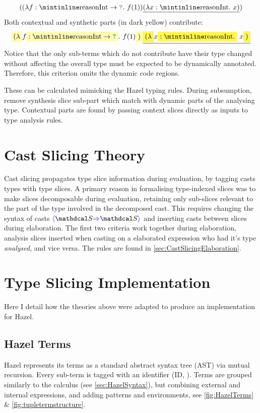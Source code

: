 \[((\lambda f: \code{Int} \to \dyn.\ f(1))\underline{(\lambda x : \code{Int}.\ x)})\]
Both contextual and synthetic parts (in dark yellow) contribute:
\[\hlcmaths[yellow!30]{(\lambda} f\hlcmaths[yellow!30]{: \code{Int} \to \dyn}.\ f(1)\hlcmaths[yellow!30]{)}\underline{\hlcmaths[yellow!70]{(\lambda} x \hlcmaths[yellow!70]{: \code{Int}.}\ x\hlcmaths[yellow!70]{)}}\]
Notice that the only sub-terms which do not contribute have their type changed without affecting the overall type must be expected to be dynamically annotated. Therefore, this criterion omits the dynamic code regions.

These can be calculated mimicking the Hazel typing rules. During subsumption, remove synthesis slice sub-part which match with dynamic parts of the analysing type. Contextual parts are found by passing context slices directly as inputs to type analysis rules.

\section{Cast Slicing Theory}\label{sec:CastSlicingTheory}
Cast slicing propagates type slice information during evaluation, by tagging casts types with type slices. A primary reason in formalising type-indexed slices was to make slices decomposable during evaluation, retaining only sub-slices relevant to the part of the type involved in the decomposed cast. This requires changing the syntax of casts $\scast{\S}{\S}$ and inserting casts between slices during elaboration. The first two criteria work together during elaboration, analysis slices inserted when casting on a elaborated expression who had it's type \textit{analysed}, and vice versa. The rules are found in
\cref{sec:CastSlicingElaboration}.

\section{Type Slicing Implementation}\label{sec:TypeSlicingImplementation}
Here I detail how the theories above were adapted to produce an implementation for Hazel.
\subsection{Hazel Terms}
\label{sec:HazelTerms}
Hazel represents its terms as a standard abstract syntax tree (AST) via mutual recursion. Every sub-term is tagged with an identifier (ID, ). Terms are grouped similarly to the calculus (see \cref{sec:HazelSyntax}), but combining external and internal expressions, and adding patterns and environments, see \cref{fig:HazelTerms} \& \ref{fig:tupletermstructure}.


